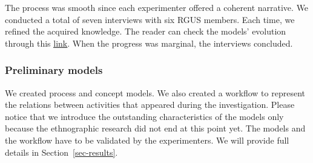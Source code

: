 The process was smooth since each experimenter offered a coherent narrative. We conducted a total of seven interviews with six RGUS members. Each time, we refined the acquired knowledge. The reader can check the models' evolution through this \href{https://zenodo.org/record/7102213#.YytmMezMLUI}{\ul{link}}. When the progress was marginal, the interviews concluded.

\subsubsection{Preliminary models}\label{sec:preliminary-models}
We created process and concept models. We also created a workflow to represent the relations between activities that appeared during the investigation. Please notice that we introduce the outstanding characteristics of the models only because the ethnographic research did not end at this point yet. The models and the workflow have to be validated by the experimenters. We will provide full details in Section~\ref{sec-results}.

